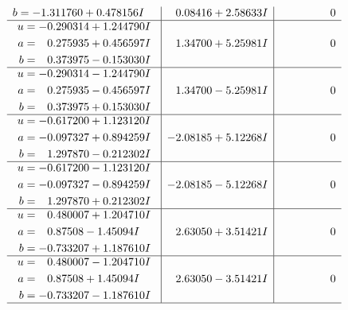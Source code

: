 \documentclass[1p]{elsarticle_modified}
\theoremstyle{definition}
\begin{document}
$$\begin{array}{c|c|c}
\begin{aligned}
b &= -1.311760 + 0.478156 I\end{aligned}
 & \phantom{-}0.08416 + 2.58633 I & \phantom{-0.000000 } 0 \\ \hline\begin{aligned}
u &= -0.290314 + 1.244790 I \\
a &= \phantom{-}0.275935 + 0.456597 I \\
b &= \phantom{-}0.373975 - 0.153030 I\end{aligned}
 & \phantom{-}1.34700 + 5.25981 I & \phantom{-0.000000 } 0 \\ \hline\begin{aligned}
u &= -0.290314 - 1.244790 I \\
a &= \phantom{-}0.275935 - 0.456597 I \\
b &= \phantom{-}0.373975 + 0.153030 I\end{aligned}
 & \phantom{-}1.34700 - 5.25981 I & \phantom{-0.000000 } 0 \\ \hline\begin{aligned}
u &= -0.617200 + 1.123120 I \\
a &= -0.097327 + 0.894259 I \\
b &= \phantom{-}1.297870 - 0.212302 I\end{aligned}
 & -2.08185 + 5.12268 I & \phantom{-0.000000 } 0 \\ \hline\begin{aligned}
u &= -0.617200 - 1.123120 I \\
a &= -0.097327 - 0.894259 I \\
b &= \phantom{-}1.297870 + 0.212302 I\end{aligned}
 & -2.08185 - 5.12268 I & \phantom{-0.000000 } 0 \\ \hline\begin{aligned}
u &= \phantom{-}0.480007 + 1.204710 I \\
a &= \phantom{-}0.87508 - 1.45094 I \\
b &= -0.733207 + 1.187610 I\end{aligned}
 & \phantom{-}2.63050 + 3.51421 I & \phantom{-0.000000 } 0 \\ \hline\begin{aligned}
u &= \phantom{-}0.480007 - 1.204710 I \\
a &= \phantom{-}0.87508 + 1.45094 I \\
b &= -0.733207 - 1.187610 I\end{aligned}
 & \phantom{-}2.63050 - 3.51421 I & \phantom{-0.000000 } 0\\
 \hline 
 \end{array}$$\newpage$$\begin{array}{c|c|c}  

\end{array}$$
\end{document}
